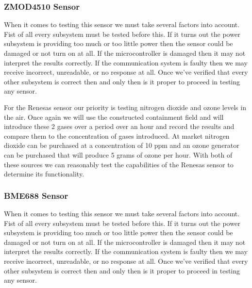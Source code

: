 \subsubsection{ZMOD4510 Sensor}
When it comes to testing this sensor we must take several factors into account. Fist of all every subsystem must be tested before this. If it turns out the power subsystem is providing too much or too little power then the sensor could be damaged or not turn on at all. If the microcontroller is damaged then it may not interpret the results correctly. If the communication system is faulty then we may receive incorrect, unreadable, or no response at all. Once we've verified that every other subsystem is correct then and only then is it proper to proceed in testing any sensor.

For the Renesas sensor our priority is testing nitrogen dioxide and ozone levels in the air. Once again we will use the constructed containment field and will introduce these 2 gases over a period over an hour and record the results and compare them to the concentration of gases introduced. At market nitrogen dioxide can be purchased at a concentration of 10 ppm and an ozone generator can be purchased that will produce 5 grams of ozone per hour. With both of these sources we can reasonably test the capabilities of the Renesas sensor to determine its functionality.

\subsubsection{BME688 Sensor}
When it comes to testing this sensor we must take several factors into account. Fist of all every subsystem must be tested before this. If it turns out the power subsystem is providing too much or too little power then the sensor could be damaged or not turn on at all. If the microcontroller is damaged then it may not interpret the results correctly. If the communication system is faulty then we may receive incorrect, unreadable, or no response at all. Once we've verified that every other subsystem is correct then and only then is it proper to proceed in testing any sensor.

